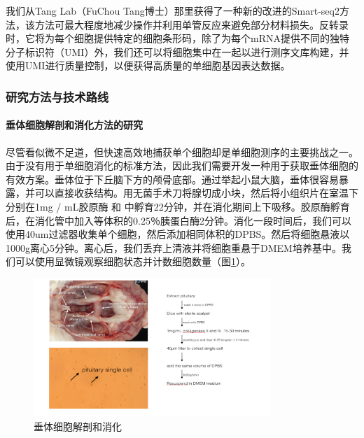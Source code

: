 \documentclass[class = opening]{whuthesis}
\begin{document}
  我们从Tang Lab（FuChou Tang博士）那里获得了一种新的改进的Smart-seq2方法，该方法可最大程度地减少操作并利用单管反应来避免部分材料损失。反转录时，它将为每个细胞提供特定的细胞条形码，除了为每个mRNA提供不同的独特分子标识符（UMI）外，我们还可以将细胞集中在一起以进行测序文库构建，并使用UMI进行质量控制，以便获得高质量的单细胞基因表达数据。
\subsubsection{研究方法与技术路线}
\paragraph{垂体细胞解剖和消化方法的研究}
  尽管看似微不足道，但快速高效地捕获单个细胞却是单细胞测序的主要挑战之一。由于没有用于单细胞消化的标准方法，因此我们需要开发一种用于获取垂体细胞的有效方案。垂体位于下丘脑下方的颅骨底部。通过举起小鼠大脑，垂体很容易暴露，并可以直接收获结构。用无菌手术刀将腺切成小块，然后将小组织片在室温下分别在1mg / mL胶原酶 和 中孵育22分钟，并在消化期间上下吸移。胶原酶孵育后，在消化管中加入等体积的0.25％胰蛋白酶2分钟。消化一段时间后，我们可以使用40um过滤器收集单个细胞，然后添加相同体积的DPBS。然后将细胞悬液以1000g离心5分钟。离心后，我们丢弃上清液并将细胞重悬于DMEM培养基中。我们可以使用显微镜观察细胞状态并计数细胞数量（图\ref{fig:scseq-micro}）。
\begin{figure}[!htb]
  \centering
  \includegraphics[width=0.8\textwidth]{figs/scseq-micro.png}
  \caption{垂体细胞解剖和消化}
  \label{fig:scseq-micro}
\end{figure}
\end{document}
